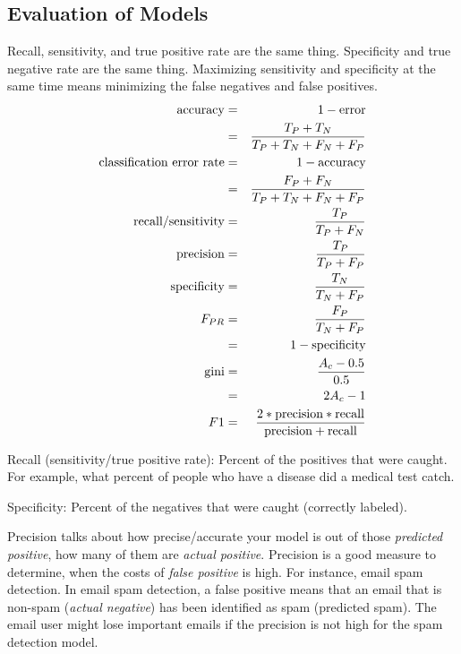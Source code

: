 	\subsection{Evaluation of Models}
Recall, sensitivity, and true positive rate are the same thing.  Specificity and true negative rate are the same thing.  Maximizing sensitivity and specificity at the same time means minimizing the false negatives and false positives.
	\begin{eqnarray}
		\textrm{accuracy} 						& = & 1 - \textrm{error} 						\\
												& = & \frac{T_P + T_N}{T_P + T_N + F_N + F_P} 	\\
		\textrm{classification error  rate}		& = & 1 - \textrm{accuracy} 					\\
												& = & \frac{F_P + F_N}{T_P + T_N + F_N + F_P} 	\\
		\textrm{recall/sensitivity}				& = & \frac{T_P}{T_P + F_N} 					\\
		\textrm{precision} 						& = & \frac{T_P}{T_P + F_P} 					\\
		\textrm{specificity} 					& = & \frac{T_N}{T_N + F_P}						\\
		\mbox{$F_{PR}$}						& = & \frac{F_P}{T_N + F_P}						\\
												& = & 1 - \textrm{specificity}					\\
		\textrm{gini}							& = & \frac{A_c - 0.5}{0.5}						\\
												& = & 2A_c - 1									\\
		F1										& = & \frac{2*\textrm{precision} * \textrm{recall}}
                                                             {\textrm{precision} + \textrm{recall}}
	\end{eqnarray}
	\begin{mathwhere}[0.4in]
	\end{mathwhere}

Recall (sensitivity/true positive rate): Percent of the positives that were caught.  For example, what percent of people who have a disease did a medical test catch.

Specificity: Percent of the negatives that were caught (correctly labeled).

Precision talks about how precise/accurate your model is out of those \emph{predicted positive}, how many of them are \emph{actual positive}.
Precision is a good measure to determine, when the costs of \emph{false positive} is high. For instance, email spam detection. In email spam detection, a false positive means that an email that is non-spam (\emph{actual negative}) has been identified as spam (predicted spam). The email user might lose important emails if the precision is not high for the spam detection model.

